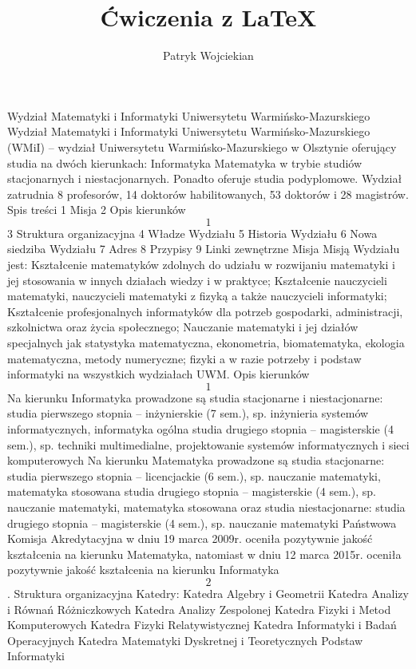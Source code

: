 \documentclass[a4paper,12pt]{article}
\title{Ćwiczenia z \LaTeX}
\author{Patryk Wojciekian}
\date{}
\begin{document}
\maketitle

Wydział Matematyki i Informatyki Uniwersytetu
Warmińsko-Mazurskiego
Wydział Matematyki i Informatyki Uniwersytetu Warmińsko-Mazurskiego (WMiI) – wydział
Uniwersytetu Warmińsko-Mazurskiego w Olsztynie oferujący studia na dwóch kierunkach:
Informatyka
Matematyka
w trybie studiów stacjonarnych i niestacjonarnych. Ponadto oferuje studia podyplomowe.
Wydział zatrudnia 8 profesorów, 14 doktorów habilitowanych, 53 doktorów i 28 magistrów.
Spis treści
1 Misja
2 Opis kierunków\[1\]
3 Struktura organizacyjna
4 Władze Wydziału
5 Historia Wydziału
6 Nowa siedziba Wydziału
7 Adres
8 Przypisy
9 Linki zewnętrzne
Misja
Misją Wydziału jest:
Kształcenie matematyków zdolnych do udziału w rozwijaniu matematyki i jej stosowania w innych
działach wiedzy i w praktyce;
Kształcenie nauczycieli matematyki, nauczycieli matematyki z fizyką a także nauczycieli informatyki;
Kształcenie profesjonalnych informatyków dla potrzeb gospodarki, administracji, szkolnictwa oraz życia
społecznego;
Nauczanie matematyki i jej działów specjalnych jak statystyka matematyczna, ekonometria,
biomatematyka, ekologia matematyczna, metody numeryczne; fizyki a w razie potrzeby i podstaw
informatyki na wszystkich wydziałach UWM.
Opis kierunków\[1\]
Na kierunku Informatyka prowadzone są studia stacjonarne i niestacjonarne:
studia pierwszego stopnia – inżynierskie (7 sem.), sp. inżynieria systemów informatycznych, informatyka
ogólna
studia drugiego stopnia – magisterskie (4 sem.), sp. techniki multimedialne, projektowanie systemów
informatycznych i sieci komputerowych
Na kierunku Matematyka prowadzone są studia stacjonarne:
studia pierwszego stopnia – licencjackie (6 sem.), sp. nauczanie matematyki, matematyka stosowana
studia drugiego stopnia – magisterskie (4 sem.), sp. nauczanie matematyki, matematyka stosowana
oraz studia niestacjonarne:
studia drugiego stopnia – magisterskie (4 sem.), sp. nauczanie matematyki
Państwowa Komisja Akredytacyjna w dniu 19 marca 2009r. oceniła pozytywnie jakość kształcenia na kierunku
Matematyka, natomiast w dniu 12 marca 2015r. oceniła pozytywnie jakość kształcenia na kierunku
Informatyka \[2\]
.
Struktura organizacyjna
Katedry:
Katedra Algebry i Geometrii
Katedra Analizy i Równań Różniczkowych
Katedra Analizy Zespolonej
Katedra Fizyki i Metod Komputerowych
Katedra Fizyki Relatywistycznej
Katedra Informatyki i Badań Operacyjnych
Katedra Matematyki Dyskretnej i Teoretycznych Podstaw Informatyki
\end{document}
